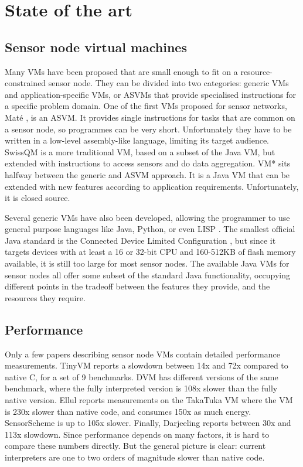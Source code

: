 \chapter{State of the art}

\section{Sensor node virtual machines}
Many VMs have been proposed that are small enough to fit on a resource-constrained sensor node. They can be divided into two categories: generic VMs and application-specific VMs, or ASVMs \cite{Culler05} that provide specialised instructions for a specific problem domain. One of the first VMs proposed for sensor networks, Mat\'e \cite{Levis:2002ku}, is an ASVM. It provides single instructions for tasks that are common on a sensor node, so programmes can be very short. Unfortunately they have to be written in a low-level assembly-like language, limiting its target audience. SwissQM \cite{Muller:2007fs} is a more traditional VM, based on a subset of the Java VM, but extended with instructions to access sensors and do data aggregation. VM* \cite{Koshy:2005ww} sits halfway between the generic and ASVM approach. It is a Java VM that can be extended with new features according to application requirements. Unfortunately, it is closed source.

Several generic VMs have also been developed, allowing the programmer to use general purpose languages like Java, Python, or even LISP \cite{Harbaum, Brouwers:2009cj, Aslam:2008, Evers:2010ur}. The smallest official Java standard is the Connected Device Limited Configuration \cite{CLDC}, but since it targets devices with at least a 16 or 32-bit CPU and 160-512KB of flash memory available, it is still too large for most sensor nodes. The available Java VMs for sensor nodes all offer some subset of the standard Java functionality, occupying different points in the tradeoff between the features they provide, and the resources they require.



\section{Performance}
Only a few papers describing sensor node VMs contain detailed performance measurements. TinyVM \cite{Hong:2009gc} reports a slowdown between 14x and 72x compared to native C, for a set of 9 benchmarks. DVM \cite{Balani:2006} has different versions of the same benchmark, where the fully interpreted version is 108x slower than the fully native version. Ellul reports measurements on the TakaTuka VM \cite{Aslam:2008, Ellul:2012thesis} where the VM is 230x slower than native code, and consumes 150x as much energy. SensorScheme \cite{Evers:2010ur} is up to 105x slower. Finally, Darjeeling \cite{Brouwers:2009cj} reports between 30x and 113x slowdown. Since performance depends on many factors, it is hard to compare these numbers directly. But the general picture is clear: current interpreters are one to two orders of magnitude slower than native code.

